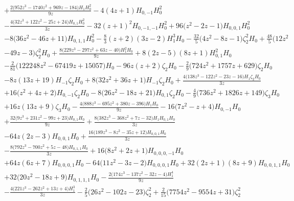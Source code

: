 \begin{eqnarray}
\nonumber \\ &&
+\frac{2  \big(952 z^3-1740 z^2+969 z-184\big) H_1 H_0^2}{9 z}
-4 (4 z+1) H_{0,-1}H_0^2
\nonumber \\ &&
-\frac{4 \big(32 z^3+122 z^2-25 z+24\big) H_{0,1} H_0^2}{3 z}
-32 (z+1)^2H_{0,-1,-1} H_0^2+96 \big(z^2-2 z-1\big) H_{0,0,1} H_0^2
\nonumber \\ && 
-8 \big(36 z^2-46z+11\big) H_{0,1,1} H_0^2
-\frac{8}{3} (z+2) (3 z-2) H_1^3 H_0-\frac{32}{5} \big(4 z^2-8 z-1\big) \zeta_2^2 H_0
+\frac{48}{5} \big(12 z^2
\nonumber \\ &&
-49z-3\big) \zeta_2^2 H_0
+\frac{8 \big(229 z^3-297 z^2+63 z-40\big) H_1^2  H_0}{9 z}+8 (2 z-5) (8 z+1) H_{0,1}^2 H_0
\nonumber \\ &&
-\frac{2}{81} \big(122248 z^2-67419z+15057\big) H_0-96  z (z+2) \zeta_2 H_0
-\frac{2}{9} \big(724z^2+1757 z+629\big) \zeta_2 H_0
\nonumber \\ &&
-8  z (13 z+19) H_{-1} \zeta_2H_0
+8 \big(32 z^2+36 z+1\big) H_{-1} \zeta_2 H_0+\frac{4 \big(138 z^3-122  z^2-23 z-16\big) H_1 \zeta_2 H_0}{3 z}
\nonumber \\ &&
+16  \big(z^2+4 z+2\big)H_{0,-1} \zeta_2 H_0-8 \big(26 z^2-18 z+21\big) H_{0,1} \zeta_2H_0
-\frac{4}{9} \big(736 z^2+1826z+149\big) \zeta_3 H_0
\nonumber \\ &&
+16  z (13 z+9) \zeta_3 H_0
-\frac{4 \big(888 z^3-695 z^2+380 z-396\big) H_1  H_0}{9 z}-16 \big(7 z^2-z+4\big) H_{0,-1} H_0
\nonumber \\ &&
+\frac{32 \big(9 z^3+231 z^2-99  z+23\big) H_{0,1} H_0}{9 z}+\frac{8 \big(382 z^3-368 z^2+7 z-32\big) H_1  H_{0,1} H_0}{3 z}
\nonumber \\ &&
-64  z (2 z-3) H_{0,0,1} H_0+\frac{16 \big(189 z^3-8  z^2-35 z+12\big) H_{0,0,1} H_0}{3 z}
\nonumber \\ &&
-\frac{8 \big(792 z^3-700 z^2+5  z-48\big) H_{0,1,1} H_0}{3 z}+16 \big(8 z^2+2 z+1\big) H_{0,0,0,-1} H_0
\nonumber \\ &&
+64 z (6 z+7) H_{0,0,0,1} H_0-64 \big(11 z^2-3 z-2\big) H_{0,0,0,1} H_0+32(2 z+1) (8 z+9) H_{0,0,1,1} H_0
\nonumber \\ &&
+32 \big(20 z^2-18 z+9\big) H_{0,1,1,1}H_0
-\frac{2 \big(174 z^3-137 z^2-32 z-4\big) H_1^4}{9 z}
\nonumber \\ &&
-\frac{4 \big(221 z^3-262 z^2+13 z+4\big) H_1^3}{3 z}
-\frac{2}{5}  \big(26 z^2-102z-23\big) \zeta_2^2
+\frac{2}{15} \big(7754 z^2-9554 z+31\big) \zeta_2^2

\end{eqnarray}
